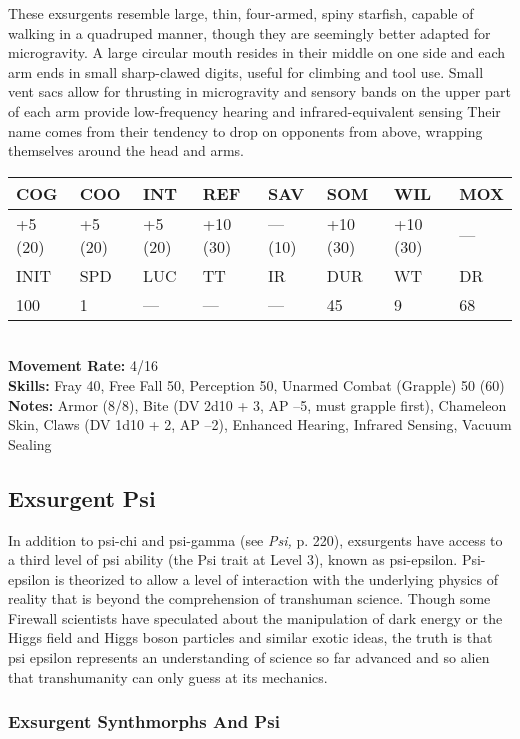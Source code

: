 These exsurgents resemble large, thin, four-armed, 
spiny starfish, capable of walking in a quadruped 
manner, though they are seemingly better adapted for 
microgravity. A large circular mouth resides in their 
middle on one side and each arm ends in small sharp-clawed
digits, useful for climbing and tool use. Small
vent sacs allow for thrusting in microgravity and 
sensory bands on the upper part of each arm provide 
low-frequency hearing and infrared-equivalent sensing
Their name comes from their tendency to drop on
opponents from above, wrapping themselves around 
the head and arms.
\\
\begin{tabular}{|l|l|l|l|l|l|l|l|}
\hline
COG & COO & INT & REF & SAV & SOM & WIL & MOX \\
\hline
+5 (20) &  +5 (20) &  +5 (20) &  +10 (30) &  — (10) &  +10 (30) &  +10 (30) &  — \\
\hline
INIT & SPD & LUC & TT & IR & DUR & WT & DR \\
\hline
100 & 1 & — & — & — & 45 & 9 & 68 \\
\hline
\end{tabular}
\\
\textbf{Movement Rate:} 4/16
\\
\textbf{Skills:} Fray 40, Free Fall 50, Perception 50, Unarmed Combat (Grapple) 50 (60) 
\\
\textbf{Notes: }Armor (8/8), Bite (DV 2d10 + 3, AP –5, must grapple first), Chameleon Skin, Claws (DV 1d10 + 2, AP –2), Enhanced Hearing, Infrared Sensing, 
Vacuum Sealing

\subsection{Exsurgent Psi }

In addition to psi-chi and psi-gamma (see \textit{Psi,} p. 220), 
exsurgents have access to a third level of psi ability 
(the Psi trait at Level 3), known as psi-epsilon. Psi-epsilon
is theorized to allow a level of interaction with
the underlying physics of reality that is beyond the 
comprehension of transhuman science. Though some 
Firewall scientists have speculated about the manipulation
of dark energy or the Higgs field and Higgs
boson particles and similar exotic ideas, the truth is 
that psi epsilon represents an understanding of science 
so far advanced and so alien that transhumanity can 
only guess at its mechanics.

\subsubsection{Exsurgent Synthmorphs And Psi}

